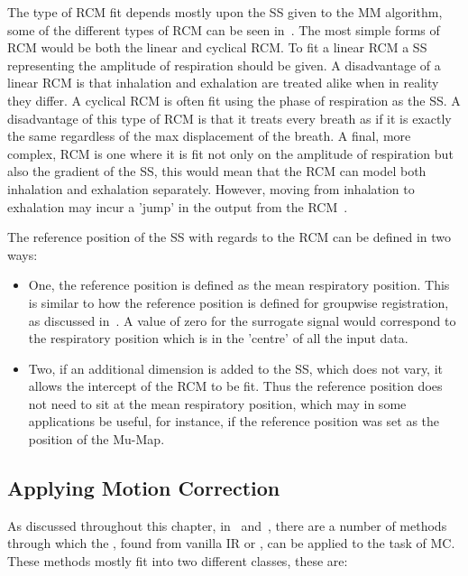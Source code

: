                 The type of \gls{RCM} fit depends mostly upon the \gls{SS} given to the \gls{MM} algorithm, some of the different types of \gls{RCM} can be seen in~. The most simple forms of \gls{RCM} would be both the linear and cyclical \gls{RCM}. To fit a linear \gls{RCM} a \gls{SS} representing the amplitude of respiration should be given. A disadvantage of a linear \gls{RCM} is that inhalation and exhalation are treated alike when in reality they differ. A cyclical \gls{RCM} is often fit using the phase of respiration as the \gls{SS}. A disadvantage of this type of \gls{RCM} is that it treats every breath as if it is exactly the same regardless of the max displacement of the breath. A final, more complex, \gls{RCM} is one where it is fit not only on the amplitude of respiration but also the gradient of the \gls{SS}, this would mean that the \gls{RCM} can model both inhalation and exhalation separately. However, moving from inhalation to exhalation may incur a 'jump' in the output from the \gls{RCM}~.
                
                The reference position of the \gls{SS} with regards to the \gls{RCM} can be defined in two ways:
            
                \begin{itemize}
                    \item One, the reference position is defined as the mean respiratory position. This is similar to how the reference position is defined for groupwise registration, as discussed in~. A value of zero for the surrogate signal would correspond to the respiratory position which is in the 'centre' of all the input data.
                    
                    \item Two, if an additional dimension is added to the \gls{SS}, which does not vary, it allows the intercept of the \gls{RCM} to be fit. Thus the reference position does not need to sit at the mean respiratory position, which may in some applications be useful, for instance, if the reference position was set as the position of the \gls{Mu-Map}.
                \end{itemize}
                
        
        \subsection{Applying Motion Correction} \label{sec:applying_motion_correction}
            As discussed throughout this chapter, in~ and~, there are a number of methods through which the , found from vanilla \gls{IR} or , can be applied to the task of \gls{MC}. These methods mostly fit into two different classes, these are:
            

